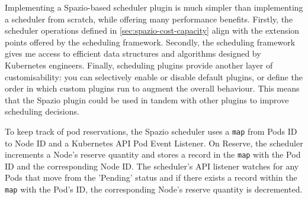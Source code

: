 Implementing a Spazio-based scheduler plugin is much simpler than implementing a
scheduler from scratch, while offering many performance benefits. Firstly, the
scheduler operations defined in \ref{sec:spazio-cost-capacity} align with the
extension points offered by the scheduling framework. Secondly, the scheduling
framework gives me access to efficient data structures and algorithms designed
by Kubernetes engineers. Finally, scheduling plugins provide another layer of
customisability: you can selectively enable or disable default plugins, or
define the order in which custom plugins run to augment the overall behaviour.
This means that the Spazio plugin could be used in tandem with other plugins to
improve scheduling decisions.

To keep track of pod reservations, the Spazio scheduler uses a \verb|map| from
Pods ID to Node ID and a Kubernetes API Pod Event
Listener. On Reserve, the scheduler increments a Node's reserve quantity and
stores a record in the \verb|map| with the Pod ID and the corresponding Node ID.
The scheduler's API listener watches for any Pods that move from the 'Pending'
status and if there exists a record within the \verb|map| with the Pod's ID, the
corresponding Node's reserve quantity is decremented.
